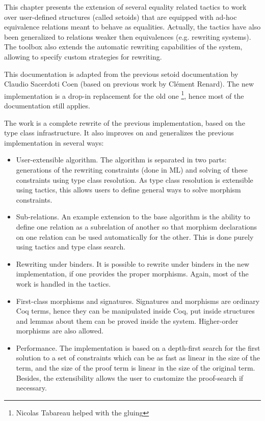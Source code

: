 \newtheorem{cscexample}{Example}

\label{setoid_replace}

This chapter presents the extension of several equality related tactics
to work over user-defined structures (called setoids) that are equipped
with ad-hoc equivalence relations meant to behave as equalities.
Actually, the tactics have also been generalized to relations weaker
then equivalences (e.g. rewriting systems). The toolbox also extends the
automatic rewriting capabilities of the system, allowing to specify
custom strategies for rewriting.

This documentation is adapted from the previous setoid documentation by
Claudio Sacerdoti Coen (based on previous work by Cl\'ement Renard).
The new implementation is a drop-in replacement for the old one \footnote{Nicolas
Tabareau helped with the gluing}, hence most of the documentation still applies.

The work is a complete rewrite of the previous implementation, based on
the type class infrastructure. It also improves on and generalizes
the previous implementation in several ways:
\begin{itemize}
\item User-extensible algorithm. The algorithm is separated in two
  parts: generations of the rewriting constraints (done in ML) and
  solving of these constraints using type class resolution. As type
  class resolution is extensible using tactics, this allows users to define
  general ways to solve morphism constraints.
\item Sub-relations. An example extension to the base algorithm is the
  ability to define one relation as a subrelation of another so that
  morphism declarations on one relation can be used automatically for
  the other. This is done purely using tactics and type class search.
\item Rewriting under binders. It is possible to rewrite under binders
  in the new implementation, if one provides the proper
  morphisms. Again, most of the work is handled in the tactics.
\item First-class morphisms and signatures. Signatures and morphisms are
  ordinary Coq terms, hence they can be manipulated inside Coq, put
  inside structures and lemmas about them can be proved inside the
  system. Higher-order morphisms are also allowed.
\item Performance. The implementation is based on a depth-first search for the first
  solution to a set of constraints which can be as fast as linear in the
  size of the term, and the size of the proof term is linear
  in the size of the original term. Besides, the extensibility allows the
  user to customize the proof-search if necessary.
\end{itemize}

